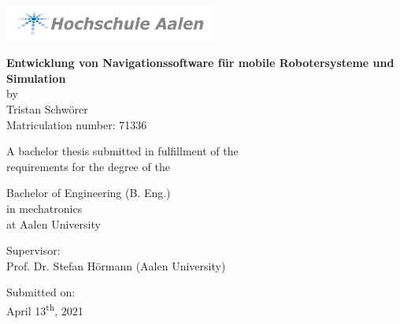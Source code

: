 \begin{titlepage}

\center\includegraphics[width=70mm]{Pictures/Logo_HSAA}

\vspace*{8mm} %
\begin{center} %
	
	\Huge\center\textbf{Entwicklung von Navigationssoftware für mobile Robotersysteme und Simulation}\\ %
	\vspace*{15mm}
	\Large{by}\\
	\Large{Tristan Schwörer}\\
	\Large{Matriculation number: 71336}\\
	
	\vspace*{11mm}
	
	\Large{A bachelor thesis submitted in fulfillment of the}\\
	\Large{requirements for the degree of the}\\
	
	\vspace*{11mm}
	
	\Large{Bachelor of Engineering (B. Eng.)}\\
	\Large{in mechatronics}\\
	\Large{at Aalen University}\\
	
	\vspace*{11mm}
	
	\Large{Supervisor:}\\
	\Large{Prof. Dr. Stefan Hörmann (Aalen University)}\\
	
	\vspace*{11mm}
	
	\Large{Submitted on:}\\
	\Large{April 13\textsuperscript{th}, 2021}\\
\end{center}
\end{titlepage}
